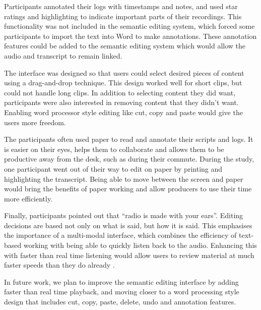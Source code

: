 Participants annotated their logs with timestamps and notes, and used star
ratings and highlighting to indicate important parts of their recordings. This
functionality was not included in the semantic editing system, which forced some
participants to import the text into Word to make annotations.
These annotation features could be added to the semantic editing system which
would allow the audio and transcript to remain linked.

The interface was designed so that users could select desired pieces of content
using a drag-and-drop technique. This design worked well for short clips, but
could not handle long clips. In addition to selecting content they did want,
participants were also interested in removing content that they didn't want. 
Enabling word processor style editing like cut, copy and paste would give the
users more freedom.

The participants often used paper to read and annotate their scripts and logs.
It is easier on their eyes, helps them to collaborate and allows them to be
productive away from the desk, such as during their commute.  During the study,
one participant went out of their way to edit on paper by printing and
highlighting the transcript.  Being able to move between the screen and paper
would bring the benefits of paper working and allow producers to use their time
more efficiently.

Finally, participants pointed out that ``radio is made with your ears''.
Editing decisions are based not only on what is said, but how it is said. This
emphasises the importance of a multi-modal interface, which combines the
efficiency of text-based working with being able to quickly listen back to the
audio.  Enhancing this with faster than real time listening would allow
users to review material at much faster speeds than they do already
\cite{Vemuri2004}.

In future work, we plan to improve the semantic editing interface by adding
faster than real time playback, and moving closer to a word processing style
design that includes cut, copy, paste, delete, undo and annotation features.



